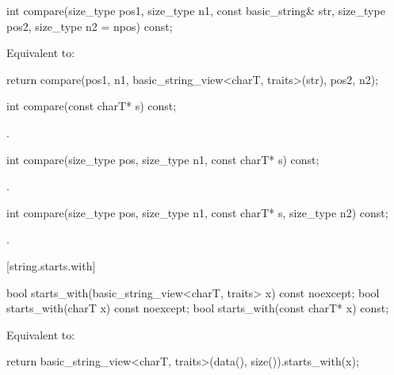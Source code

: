 %
\begin{itemdecl}
int compare(size_type pos1, size_type n1, const basic_string& str,
            size_type pos2, size_type n2 = npos) const;
\end{itemdecl}

\begin{itemdescr}
\pnum
\effects Equivalent to:
\begin{codeblock}
return compare(pos1, n1, basic_string_view<charT, traits>(str), pos2, n2);
\end{codeblock}
\end{itemdescr}

%
\begin{itemdecl}
int compare(const charT* s) const;
\end{itemdecl}

\begin{itemdescr}
\pnum
\returns
{}.
\end{itemdescr}

%
\begin{itemdecl}
int compare(size_type pos, size_type n1, const charT* s) const;
\end{itemdecl}

\begin{itemdescr}
\pnum
\returns {}.
\end{itemdescr}

%
\begin{itemdecl}
int compare(size_type pos, size_type n1, const charT* s, size_type n2) const;
\end{itemdecl}

\begin{itemdescr}
\pnum
\returns {}.
\end{itemdescr}

[string.starts.with]{}

%
\begin{itemdecl}
bool starts_with(basic_string_view<charT, traits> x) const noexcept;
bool starts_with(charT x) const noexcept;
bool starts_with(const charT* x) const;
\end{itemdecl}

\begin{itemdescr}
\pnum
\effects
Equivalent to:
\begin{codeblock}
return basic_string_view<charT, traits>(data(), size()).starts_with(x);
\end{codeblock}
\end{itemdescr}

